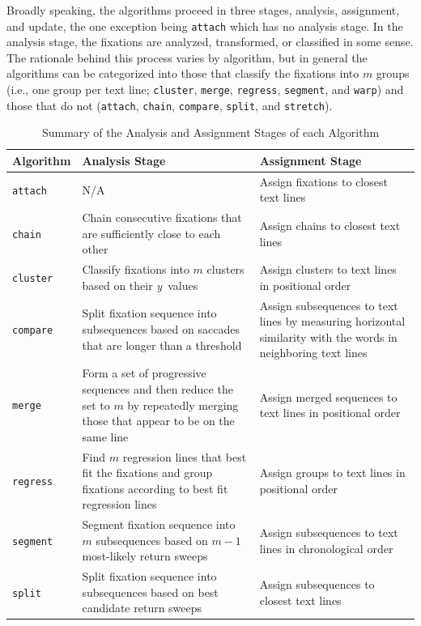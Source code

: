 \documentclass[doc,biblatex]{apa7}
\begin{document}
Broadly speaking, the algorithms proceed in three stages, analysis, assignment, and update, the one exception being \texttt{attach} which has no analysis stage. In the analysis stage, the fixations are analyzed, transformed, or classified in some sense. The rationale behind this process varies by algorithm, but in general the algorithms can be categorized into those that classify the fixations into $m$ groups (i.e., one group per text line; \texttt{cluster}, \texttt{merge}, \texttt{regress}, \texttt{segment}, and \texttt{warp}) and those that do not (\texttt{attach}, \texttt{chain}, \texttt{compare}, \texttt{split}, and \texttt{stretch}).

	\begin{table}
	\begin{center}
	\begin{threeparttable}
	\caption{Summary of the Analysis and Assignment Stages of each Algorithm}
	\begin{tabular}{l p{6.5cm} p{6.5cm}}
	\hline
	Algorithm        & Analysis Stage & Assignment Stage \\ \hline
	\texttt{attach}  & N/A & Assign fixations to closest text lines \\
	\texttt{chain}   & Chain consecutive fixations that are sufficiently close to each other & Assign chains to closest text lines \\
	\texttt{cluster} & Classify fixations into $m$ clusters based on their \textit{y}~values & Assign clusters to text lines in positional order \\
	\texttt{compare} & Split fixation sequence into subsequences based on saccades that are longer than a threshold & Assign subsequences to text lines by measuring horizontal similarity with the words in neighboring text lines \\
	\texttt{merge}   & Form a set of progressive sequences and then reduce the set to $m$ by repeatedly merging those that appear to be on the same line & Assign merged sequences to text lines in positional order \\
	\texttt{regress} & Find $m$ regression lines that best fit the fixations and group fixations according to best fit regression lines & Assign groups to text lines in positional order \\
	\texttt{segment} & Segment fixation sequence into $m$ subsequences based on $m-1$ most-likely return sweeps & Assign subsequences to text lines in chronological order \\
	\texttt{split}   & Split fixation sequence into subsequences based on best candidate return sweeps & Assign subsequences to closest text lines \\

\end{tabular}
\end{threeparttable}
\end{center}
\end{table}
\end{document}
